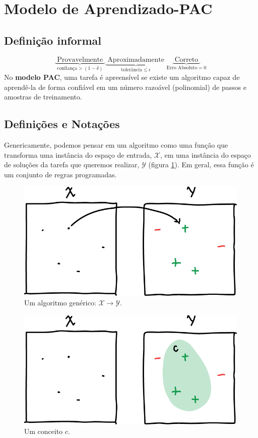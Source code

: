\documentclass[
10pt, %
a4paper, %
onecolumn, %
]{article}
\begin{document}
\section{Modelo de Aprendizado-PAC}

\subsection{Definição informal}
\begin{equation}
    \underbrace{\text{ Provavelmente }}_{\textrm{confiança} >(1-\delta)}
    \underbrace{\text{ Aproximadamente }}_{\textrm{tolerância} \leq\epsilon}
    \underbrace{\text{   Correto   }}_{\textrm{Erro Absoluto} = 0} \nonumber
  \end{equation}
  No \textbf{modelo PAC}, uma tarefa é apreensível se existe um algoritmo capaz de aprendê-la de forma confiável em um número razoável (polinomial) de passos e amostras de treinamento.

\subsection{Definições e Notações}

Genericamente, podemos pensar em um algoritmo como uma função que transforma uma  instância do espaço de entrada, $\mathcal{X}$, em uma instância do espaço de soluções da tarefa que queremos realizar, $\mathcal{Y}$ (figura \ref{fig:function}). Em geral, essa função é um conjunto de regras programadas.
\begin{figure}[!htp]
    \centering
    \includegraphics[width=.5\textwidth]{function}
    \caption{Um algoritmo genérico: $\mathcal{X} \to \mathcal{Y}$.}
    \label{fig:function}
\end{figure}

\begin{figure}[!htp]
    \centering
    \includegraphics[width=.5\textwidth]{concept}
    \caption{Um conceito $c$.}
    \label{fig:concept}
\end{figure}
\end{document}
